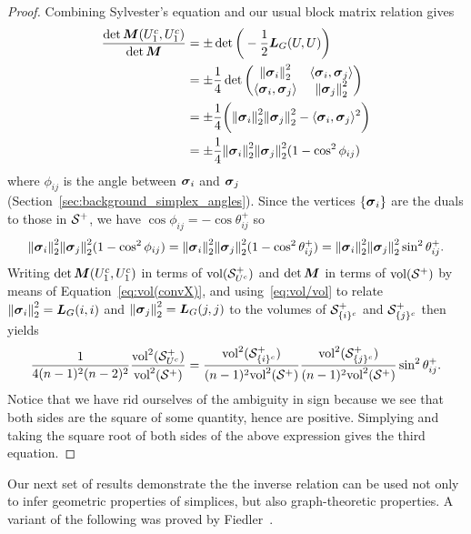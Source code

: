 \begin{proof}
	Combining Sylvester's equation and our usual block matrix relation gives 
	\begin{align*}
	\frac{\det\M(U_1^c,U_1^c)}{\det \M} &= \pm \det \bigg(-\frac{1}{2}\L_G(U,U)\bigg) \\
	&= 
	\pm \frac{1}{4}\det\begin{pmatrix}
	\norm{\sv_i}_2^2 & \la \sv_i,\sv_j\ra \\
	\la \sv_i,\sv_j\ra & \norm{\sv_j}_2^2 
	\end{pmatrix} \\
	&=\pm \frac{1}{4}\bigg(\norm{\sv_i}_2^2\norm{\sv_j}_2^2 - \la \sv_i,\sv_j\ra^2\bigg) \\
	&= \pm\frac{1}{4}\norm{\sv_i}_2^2\norm{\sv_j}_2^2(1 - \cos^2\phi_{ij})
	\end{align*}
	where $\phi_{ij}$ is the angle between $\vb*{\sigma}_i$ and $\vb*{\sigma}_j$ (Section~\ref{sec:background_simplex_angles}). Since the vertices $\{\vb*{\sigma}_i\}$ are the  duals  to those in $\mathcal{S}^+$, we have $\cos\phi_{ij}=-\cos\theta_{ij}^+$  so \[\norm{\vb*{\sigma}_i}_2^2\norm{\vb*{\sigma}_j}_2^2(1 - \cos^2\phi_{ij}) = \norm{\vb*{\sigma}_i}_2^2\norm{\vb*{\sigma}_j}_2^2(1 - \cos^2\theta_{ij}^+) =  \norm{\vb*{\sigma}_i}_2^2\norm{\vb*{\sigma}_j}_2^2\sin^2\theta_{ij}^+.\]   
	Writing $\det\M(U_1^c,U_1^c)$  in terms of $\textnormal{vol}(\mathcal{S}_{U^c}^+)$ and $\det \M$  in terms of $\textnormal{vol}(\mathcal{S}^+)$ by  means of Equation~\eqref{eq:vol(convX)}, and using~\eqref{eq:vol/vol} to relate $\norm{\vb*{\sigma}_i}_2^2=\vb*{L}_G(i,i)$ and $\norm{\vb*{\sigma}_j}_2^2=\vb*{L}_G(j,j)$  to  the volumes of $\mathcal{S}_{\{i\}^c}^+$  and $\mathcal{S}_{\{j\}^c}^+$ then yields 
	\begin{align*}
	\frac{1}{4(n-1)^2(n-2)^2}\frac{\textnormal{vol}^2(\mathcal{S}_{U^c}^+)}{\textnormal{vol}^2(\mathcal{S}^+)} =  \frac{\textnormal{vol}^2(\mathcal{S}_{\{i\}^c}^+)}{(n-1)^2\textnormal{vol}^2(\mathcal{S}^+)}\frac{\textnormal{vol}^2(\mathcal{S}_{\{j\}^c}^+)}{(n-1)^2\textnormal{vol}^2(\mathcal{S}^+)}\sin^2\theta_{ij}^+.
	\end{align*}
	Notice that we have rid ourselves  of the ambiguity in sign because we see that both  sides are the square of some quantity, hence are  positive. 
	Simplying and taking the square root of both sides of the above expression gives the third equation.
\end{proof}





Our next set of results demonstrate the the inverse relation can be used not only to infer geometric properties of simplices, but also graph-theoretic properties. A variant of the following  was proved by Fiedler~\cite{fiedler2011matrices}. 

